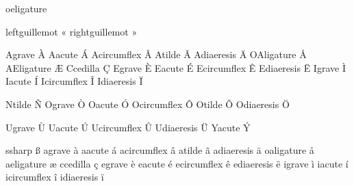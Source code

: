 

\startencoding[pdfdoc] %

 oeligature        ^^9c

 leftguillemot     ^^ab
 rightguillemot    ^^bb

 Agrave            ^^c0
 Aacute            ^^c1
 Acircumflex       ^^c2
 Atilde            ^^c3
 Adiaeresis        ^^c4
 OAligature        ^^c5
 AEligature        ^^c6
 Ccedilla          ^^c7
 Egrave            ^^c8
 Eacute            ^^c9
 Ecircumflex       ^^ca
 Ediaeresis        ^^cb
 Igrave            ^^cc
 Iacute            ^^cd
 Icircumflex       ^^ce
 Idiaeresis        ^^cf

 Ntilde            ^^d1
 Ograve            ^^d2
 Oacute            ^^d3
 Ocircumflex       ^^d4
 Otilde            ^^d5
 Odiaeresis        ^^d6

 Ugrave            ^^d9
 Uacute            ^^da
 Ucircumflex       ^^db
 Udiaeresis        ^^dc
 Yacute            ^^dd

 ssharp            ^^df
 agrave            ^^e0
 aacute            ^^e1
 acircumflex       ^^e2
 atilde            ^^e3
 adiaeresis        ^^e4
 oaligature        ^^e5
 aeligature        ^^e6
 ccedilla          ^^e7
 egrave            ^^e8
 eacute            ^^e9
 ecircumflex       ^^ea
 ediaeresis        ^^eb
 igrave            ^^ec
 iacute            ^^ed
 icircumflex       ^^ee
 idiaeresis        ^^ef

